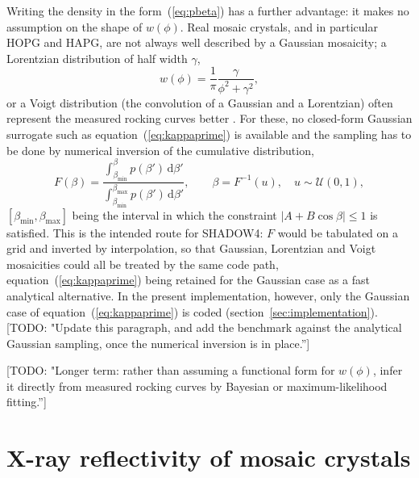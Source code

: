 \documentclass{iucr}
\newcommand{\todo}[1]{{\color{red}[TODO: "#1'']}}
\begin{document}
Writing the density in the form~(\ref{eq:pbeta}) has a further advantage: it makes
no assumption on the shape of $w(\phi)$. Real mosaic crystals, and in particular
HOPG and HAPG, are not always well described by a Gaussian mosaicity; a Lorentzian
distribution of half width $\gamma$,
\begin{equation}
w(\phi) = \frac{1}{\pi} \frac{\gamma}{\phi^2 + \gamma^2} ,
\label{eq:lorentzian}
\end{equation}
or a Voigt distribution (the convolution of a Gaussian and a Lorentzian) often
represent the measured rocking curves better \cite{Gerlach2015, Smid2021}. For these, no closed-form Gaussian
surrogate such as equation~(\ref{eq:kappaprime}) is available and the sampling has
to be done by numerical inversion of the cumulative distribution,
\begin{equation}
F(\beta) = \frac{\displaystyle\int_{\beta_\mathrm{min}}^{\beta} p(\beta')\,\mathrm{d}\beta'}
                {\displaystyle\int_{\beta_\mathrm{min}}^{\beta_\mathrm{max}} p(\beta')\,\mathrm{d}\beta'} ,
\qquad
\beta = F^{-1}(u), \quad u \sim \mathcal{U}(0,1) ,
\label{eq:cdfinv}
\end{equation}
$[\beta_\mathrm{min}, \beta_\mathrm{max}]$ being the interval in which the
constraint $|A + B\cos\beta| \le 1$ is satisfied. This is the intended route for
SHADOW4: $F$ would be tabulated on a grid and inverted by interpolation, so that
Gaussian, Lorentzian and Voigt mosaicities could all be treated by the same code
path, equation~(\ref{eq:kappaprime}) being retained for the Gaussian case as a
fast analytical alternative. In the present implementation, however, only the
Gaussian case of equation~(\ref{eq:kappaprime}) is coded
(section~\ref{sec:implementation}). \todo{Update this paragraph, and add the
benchmark against the analytical Gaussian sampling, once the numerical inversion
is in place.}

\todo{Longer term: rather than assuming a functional form for $w(\phi)$, infer it
directly from measured rocking curves by Bayesian or maximum-likelihood fitting.}


\section{X-ray reflectivity of mosaic crystals}
\label{sec:reflectivity}
\end{document}
